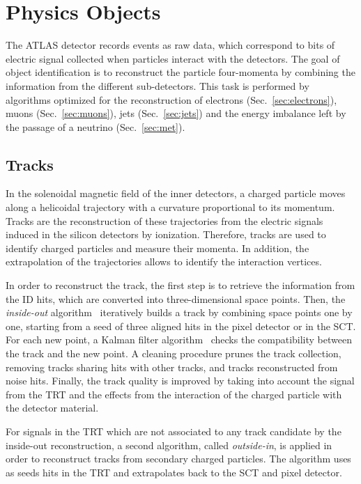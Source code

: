 \chapter{Physics Objects}
\label{sec:objects}

The ATLAS detector records events as raw data, 
which correspond to bits of electric signal collected 
when particles interact with the detectors. 
The goal of object identification is to reconstruct the particle four-momenta
by combining the information from the different sub-detectors.
This task is performed by algorithms optimized for the reconstruction of
electrons (Sec.~\ref{sec:electrons}), muons (Sec.~\ref{sec:muons}), 
jets (Sec.~\ref{sec:jets}) and the energy imbalance left
by the passage of a neutrino (Sec.~\ref{sec:met}).

\section{Tracks}
\label{sec:tracks}

In the solenoidal magnetic field of the inner detectors,
a charged particle moves along a helicoidal trajectory with a 
curvature proportional to its momentum.
Tracks are the reconstruction of these trajectories from the electric 
signals induced in the silicon detectors by ionization.
Therefore, tracks are used to identify charged particles and measure
their momenta. In addition, the extrapolation of the trajectories
allows to identify the interaction vertices.
 
In order to reconstruct the track, the first step is to retrieve the
information from the ID hits, which are converted into
three-dimensional space points. Then, the {\it inside-out}
algorithm~\cite{insideoutalgo}  iteratively builds a track by
combining space points one by one, starting from a seed of three
aligned hits in the pixel detector or in the SCT. 
For each new point, a Kalman filter algorithm~\cite{kalmanfilter}
checks the compatibility between the track and the new point. 
A cleaning procedure prunes the track collection, removing 
tracks sharing hits with other tracks, and tracks reconstructed from
noise hits. 
Finally, the track quality is improved by taking into account the
signal from the TRT and the effects from the interaction of the
charged particle with the detector material. 

For signals in the TRT which are not associated to any track candidate
by the inside-out reconstruction, a second algorithm,
called {\it outside-in}, is applied in order to
reconstruct tracks from secondary charged particles. 
The algorithm uses as seeds hits in the TRT
and extrapolates back to the SCT and pixel detector.


